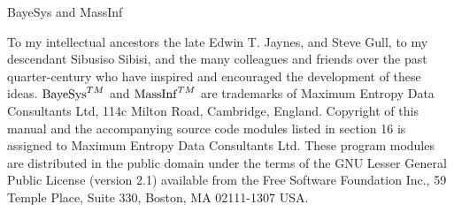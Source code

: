 \centerline{\bigger BayeSys and MassInf}
\bigskip
\bigskip
\bigskip
\bigskip
\bigskip
\bigskip
{\bigger
\noindent To my intellectual ancestors the late Edwin T. Jaynes, and Steve Gull,  to my descendant Sibusiso Sibisi, 
and the many colleagues and friends over the past quarter-century who have inspired and encouraged the development of these ideas.}
\vskip 13cm
\noindent ${\rm BayeSys}^{TM}$ and ${\rm MassInf}^{TM}$ are trademarks of Maximum Entropy Data Consultants Ltd, 114c Milton Road, Cambridge, England.
Copyright of this manual and the accompanying source code modules listed in section 16 is assigned to Maximum Entropy Data Consultants Ltd.
These program modules are distributed in the public domain under the terms of the GNU Lesser General Public License (version 2.1) available from the 
Free Software Foundation Inc., 59 Temple Place, Suite 330, Boston, MA  02111-1307  USA.

\vfill\eject

